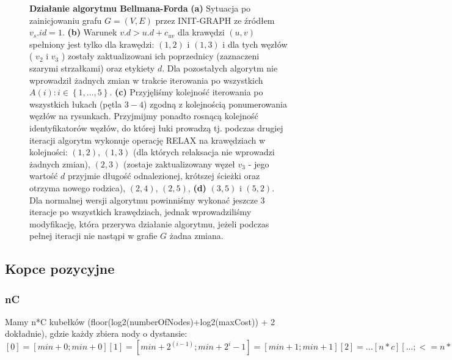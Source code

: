 \begin{figure}[!htbp]
\begin{subfigure}[b]{0.45\textwidth}
		\caption{}
	\end{subfigure}%
	\caption{\textbf{Działanie algorytmu Bellmana-Forda} \textbf{(a)} Sytuacja po zainicjowaniu grafu $G = \left( V, E \right)$ przez \textsf{INIT-GRAPH} ze źródłem $v_{s}.id = 1$. \textbf{(b)} Warunek $ v.d > u.d + c_{uv} $ dla krawędzi $ \left( u, v \right) $ spełniony jest tylko dla krawędzi: $ \left( 1, 2 \right) $ i $ \left( 1, 3 \right) $ i dla tych węzłów ( $v_{2}$ i $v_{3}$ ) zostały zaktualizowani ich poprzednicy (zaznaczeni szarymi strzałkami) oraz etykiety $d$. Dla pozostałych algorytm nie wprowadził żadnych zmian w trakcie iterowania po wszystkich $ A \left( i \right) : i \in \left\{ 1, \ldots, 5\right\}$. \textbf{(c)} Przyjęliśmy kolejność iterowania po wszystkich łukach (pętla $3-4$) zgodną z kolejnością ponumerowania węzłów na rysunkach. Przyjmijmy ponadto rosnącą kolejność identyfikatorów węzłów, do której łuki prowadzą tj. podczas drugiej iteracji algorytm wykonuje operację \textsf{RELAX} na krawędziach w kolejności: $ \left( 1, 2 \right) $, $ \left( 1, 3 \right) $ (dla których relaksacja nie wprowadzi żadnych zmian), $ \left( 2, 3 \right) $ (zostaje zaktualizowany węzeł $v_{3}$ - jego wartość $d$ przyjmie długość odnalezionej, krótszej ścieżki oraz otrzyma nowego rodzica), $ \left( 2, 4 \right) $, $ \left( 2, 5 \right) $, \textbf{(d)} $ \left( 3, 5 \right) $ i $ \left( 5, 2 \right) $. Dla normalnej wersji algorytmu powinniśmy wykonać jeszcze 3 iteracje po wszystkich krawędziach, jednak wprowadziliśmy modyfikację, która przerywa działanie algorytmu, jeżeli podczas pełnej iteracji nie nastąpi w grafie $G$ żadna zmiana.} \label{fig:exampleBellmanFord}
\end{figure}


\subsection{Kopce pozycyjne}

\subsubsection{nC}

Mamy n*C kubełków (floor(log2(numberOfNodes)+log2(maxCost)) + 2 dokładnie), gdzie każdy zbiera nody o dystansie:
$
[0] = [min+0;min+0]
[1] = [min+2^(i-1);min+2^i-1] = [min+1;min+1]
[2] = ...
[n*c] [... ; <= n*C]$


